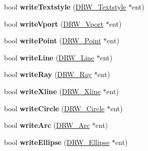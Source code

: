 \begin{DoxyCompactItemize}
\item 
\hypertarget{classdxfRW_a4031ffed38fbaee96cab5b525c2d5df3}{bool {\bfseries write\-Textstyle} (\hyperlink{classDRW__Textstyle}{D\-R\-W\-\_\-\-Textstyle} $\ast$ent)}\label{classdxfRW_a4031ffed38fbaee96cab5b525c2d5df3}

\item 
\hypertarget{classdxfRW_a3b8ac8bd3e5eb521c56a6b81503472cc}{bool {\bfseries write\-Vport} (\hyperlink{classDRW__Vport}{D\-R\-W\-\_\-\-Vport} $\ast$ent)}\label{classdxfRW_a3b8ac8bd3e5eb521c56a6b81503472cc}

\item 
\hypertarget{classdxfRW_ab0ebc1deff9fdf6f2bc87f3f32854e1f}{bool {\bfseries write\-Point} (\hyperlink{classDRW__Point}{D\-R\-W\-\_\-\-Point} $\ast$ent)}\label{classdxfRW_ab0ebc1deff9fdf6f2bc87f3f32854e1f}

\item 
\hypertarget{classdxfRW_a20c91611222b73dba05b063021403455}{bool {\bfseries write\-Line} (\hyperlink{classDRW__Line}{D\-R\-W\-\_\-\-Line} $\ast$ent)}\label{classdxfRW_a20c91611222b73dba05b063021403455}

\item 
\hypertarget{classdxfRW_a991399b5a67236ba95688f9f5f30c876}{bool {\bfseries write\-Ray} (\hyperlink{classDRW__Ray}{D\-R\-W\-\_\-\-Ray} $\ast$ent)}\label{classdxfRW_a991399b5a67236ba95688f9f5f30c876}

\item 
\hypertarget{classdxfRW_a70b9e2610199f154f8c4ee30a6524417}{bool {\bfseries write\-Xline} (\hyperlink{classDRW__Xline}{D\-R\-W\-\_\-\-Xline} $\ast$ent)}\label{classdxfRW_a70b9e2610199f154f8c4ee30a6524417}

\item 
\hypertarget{classdxfRW_a032103766d08563da7e18f68b4134b50}{bool {\bfseries write\-Circle} (\hyperlink{classDRW__Circle}{D\-R\-W\-\_\-\-Circle} $\ast$ent)}\label{classdxfRW_a032103766d08563da7e18f68b4134b50}

\item 
\hypertarget{classdxfRW_acddf3556107085ba65501f77609531b6}{bool {\bfseries write\-Arc} (\hyperlink{classDRW__Arc}{D\-R\-W\-\_\-\-Arc} $\ast$ent)}\label{classdxfRW_acddf3556107085ba65501f77609531b6}

\item 
\hypertarget{classdxfRW_a9bfc721ff31109bf2acd8ee529dfc369}{bool {\bfseries write\-Ellipse} (\hyperlink{classDRW__Ellipse}{D\-R\-W\-\_\-\-Ellipse} $\ast$ent)}\label{classdxfRW_a9bfc721ff31109bf2acd8ee529dfc369}


\end{DoxyCompactItemize}
